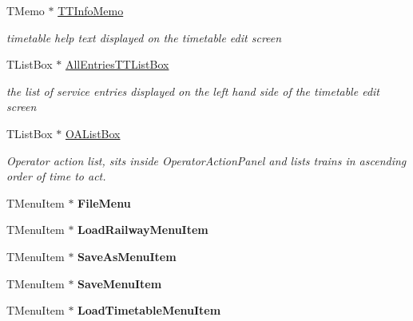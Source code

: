 \begin{DoxyCompactItemize}
T\+Memo $\ast$ \mbox{\hyperlink{class_t_interface_a5f4cdf54d45ef2756fbcc7c1faeb7751}{T\+T\+Info\+Memo}}
\begin{DoxyCompactList}\small\item\em timetable help text displayed on the timetable edit screen \end{DoxyCompactList}\item 
\mbox{\label{class_t_interface_a2186c4827761360ddb9bccc3d8ef4295}} 
T\+List\+Box $\ast$ \mbox{\hyperlink{class_t_interface_a2186c4827761360ddb9bccc3d8ef4295}{All\+Entries\+T\+T\+List\+Box}}
\begin{DoxyCompactList}\small\item\em the list of service entries displayed on the left hand side of the timetable edit screen \end{DoxyCompactList}\item 
\mbox{\label{class_t_interface_a06c02506913fc9d0fe5f13c4950ff99f}} 
T\+List\+Box $\ast$ \mbox{\hyperlink{class_t_interface_a06c02506913fc9d0fe5f13c4950ff99f}{O\+A\+List\+Box}}
\begin{DoxyCompactList}\small\item\em Operator action list, sits inside Operator\+Action\+Panel and lists trains in ascending order of time to act. \end{DoxyCompactList}\item 
\mbox{\label{class_t_interface_a60596fc589806809a947f92681a0eb76}} 
T\+Menu\+Item $\ast$ {\bfseries File\+Menu}
\item 
\mbox{\label{class_t_interface_a9a18bcb63978a68899e33d5650d1b0d1}} 
T\+Menu\+Item $\ast$ {\bfseries Load\+Railway\+Menu\+Item}
\item 
\mbox{\label{class_t_interface_aba64b040556635901c62e90177ae077d}} 
T\+Menu\+Item $\ast$ {\bfseries Save\+As\+Menu\+Item}
\item 
\mbox{\label{class_t_interface_a5cfb2e50d6b0a7c80e665076ed824bf7}} 
T\+Menu\+Item $\ast$ {\bfseries Save\+Menu\+Item}
\item 
\mbox{\label{class_t_interface_a8bdebb5d77cd0866470536cc6608083c}} 
T\+Menu\+Item $\ast$ {\bfseries Load\+Timetable\+Menu\+Item}

\end{DoxyCompactItemize}
